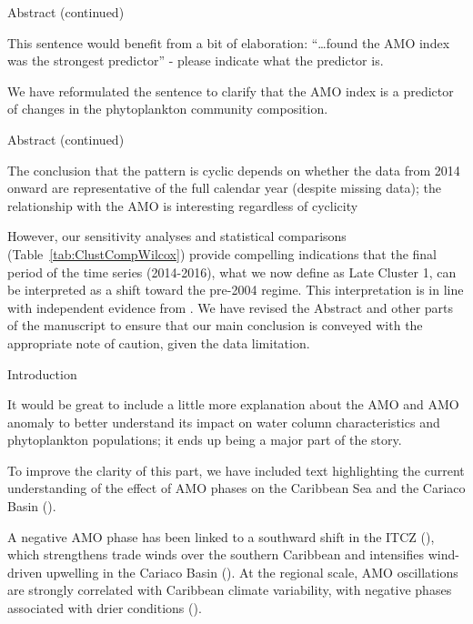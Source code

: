 \documentclass[12pt,english]{reviewresponse}
\begin{document}
\begin{revcomment}
	Abstract (continued)
    
    This sentence would benefit from a bit of elaboration: “…found the AMO index was the strongest predictor” - please indicate what the predictor is.
\end{revcomment}
\begin{revresponse}
	We have reformulated the sentence to clarify that the AMO index is a predictor of changes in the phytoplankton community composition.
\end{revresponse}

\begin{revcomment}
	Abstract (continued)
    
    The conclusion that the pattern is cyclic depends on whether the data from 2014 onward are representative of the full calendar year (despite missing data); the relationship with the AMO is interesting regardless of cyclicity
\end{revcomment}
\begin{revresponse}
    However, our sensitivity analyses and statistical comparisons (Table~\ref{tab:ClustCompWilcox}) provide compelling indications that the final period of the time series (2014-2016), what we now define as Late Cluster 1, can be interpreted as a shift toward the pre-2004 regime. This interpretation is in line with independent evidence from \cite{gomez_gaspar_variacion_2025}. 
    We have revised the Abstract and other parts of the manuscript to ensure that our main conclusion is conveyed with the appropriate note of caution, given the data limitation.
\end{revresponse}


\begin{revcomment}
	Introduction
    
    It would be great to include a little more explanation about the AMO and AMO anomaly to better understand its impact on water column characteristics and phytoplankton populations; it ends up being a major part of the story.
\end{revcomment}
\begin{revresponse}
	To improve the clarity of this part, we have included text highlighting the current understanding of the effect of AMO phases on the Caribbean Sea and the Cariaco Basin ().

    \begin{changes}
        A negative AMO phase has been linked to a southward shift in the ITCZ (\cite{knight_climate_2006}), which strengthens trade winds over the southern Caribbean and intensifies wind-driven upwelling in the Cariaco Basin (\cite{taylor_ecosystem_2012}). At the regional scale, AMO oscillations are strongly correlated with Caribbean climate variability, with negative phases associated with drier conditions (\cite{stephenson_changes_2014}).
    \end{changes}

\end{revresponse}
\end{document}
